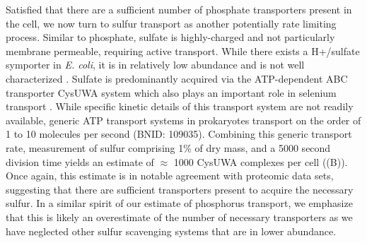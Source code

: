Satisfied that there are a sufficient number of phosphate transporters
present in the cell, we now turn to sulfur transport as another potentially rate
limiting process. Similar to phosphate, sulfate is  highly-charged
and not particularly membrane permeable, requiring active
transport. While there exists a H+/sulfate symporter in \textit{E.
coli}, it is in relatively low abundance and is not well characterized
\citep{zhang2014}. Sulfate is predominantly acquired via the ATP-dependent ABC
transporter CysUWA system which also plays an important role in selenium
transport \citep{sekowska2000, sirko1995}. While specific kinetic details of
this transport system are not readily available, generic ATP transport
systems in prokaryotes transport on the order of 1 to 10 molecules per second
(BNID: 109035). Combining this generic
transport rate, measurement of sulfur comprising 1\% of dry mass, and a 5000
second division time yields an estimate of $\approx$ 1000 CysUWA
complexes per cell ((B)). Once again, this estimate
is in notable agreement with proteomic data sets, suggesting that there are
sufficient transporters present to acquire the necessary sulfur. In a similar
spirit of our estimate of phosphorus transport, we emphasize that this is
likely an overestimate of the number of necessary transporters as we have
neglected other sulfur scavenging systems that are in lower abundance.


